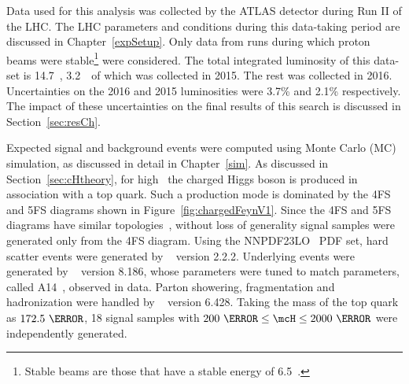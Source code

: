 \par Data used for this analysis was collected by the ATLAS detector during Run II 
of the LHC. The LHC parameters and conditions during this data-taking period are discussed 
in Chapter~\ref{expSetup}. Only data from runs during which proton beams were stable\footnote{Stable beams 
are those that have a stable energy of 6.5~\TeV.} were considered. 
The total integrated luminosity of this data-set is 14.7~\ifb, 3.2~\ifb\ of 
which was collected in 2015. The rest was collected in 2016. Uncertainties on the 2016 
and 2015 luminosities were 3.7\% and 2.1\% respectively. The impact of these uncertainties on the 
final results of this search is discussed in Section~\ref{sec:resCh}. 

\par Expected signal and background events were computed using Monte Carlo (MC) simulation, 
as discussed in detail in Chapter~\ref{sim}. 
%
As discussed in Section~\ref{sec:cHtheory}, 
for high \mcH\ the charged Higgs boson is produced in association with a top quark. Such a production mode 
is dominated by the 4FS and 5FS diagrams shown in Figure~\ref{fig:chargedFeynV1}.
 Since the 4FS and 5FS diagrams have similar topologies~\cite{Flechl:2014wfa},  
without loss of generality signal samples were generated only from the 4FS diagram. 
Using the NNPDF23LO~\cite{Ball:2012cx} PDF set, hard scatter 
events were generated by \MGMCatNLO~\cite{Alwall:2014hca} version 2.2.2.
Underlying events were generated by ~\cite{Pythia8} version 8.186,
 whose parameters were tuned to match parameters, 
called A14~\cite{ATL-PHYS-PUB-2014-021}, observed in data. 
Parton showering, fragmentation and hadronization were handled 
by \PYTHIA~\cite{Sjostrand:2000wi} version 6.428. 
Taking the mass of the top quark as $172.5~\GeV$,  
18 signal samples with $200~\GeV\leq\mcH\leq2000~\GeV$ were independently generated.   

